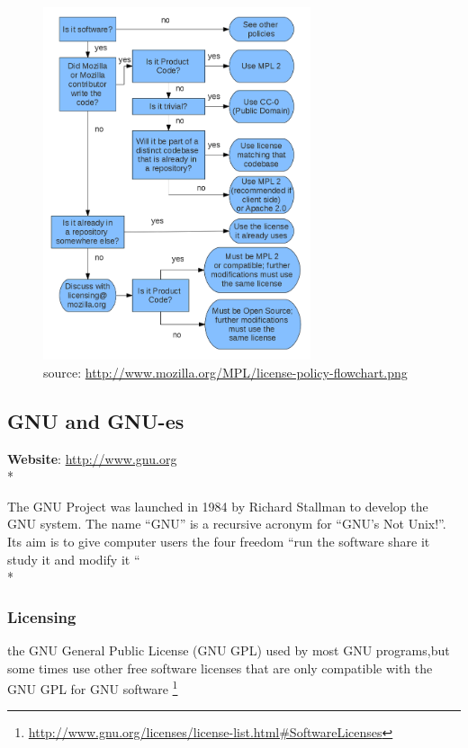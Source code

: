 \documentclass[11pt]{article} %
\begin{document}
\begin{figure}[H]
    \centering
    \includegraphics[width=0.7\textwidth]{chart}
    \caption{source: \url {http://www.mozilla.org/MPL/license-policy-flowchart.png}}
    \label{}
\end{figure}

\subsection{GNU and GNU-es} %

\textbf{Website}: \url{ http://www.gnu.org}\\*

The GNU Project was launched in 1984  by Richard Stallman to develop the GNU system. The name “GNU” is a recursive acronym for “GNU's Not Unix!”. Its aim is to give computer users the four freedom “run the software share it study it and modify it “\\*

\subsubsection{Licensing}
 the GNU General Public License (GNU GPL) used by most GNU programs,but some times use  other free software licenses that are only compatible with the GNU GPL for GNU software 
\footnote {\url {http://www.gnu.org/licenses/license-list.html\#SoftwareLicenses}}
\end{document}
